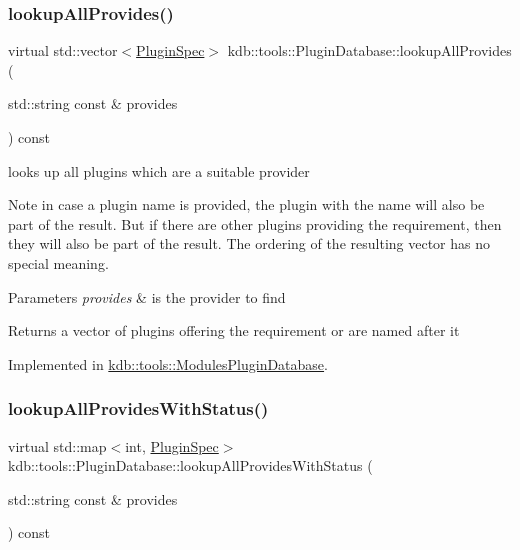 \subsubsection{\texorpdfstring{lookup\+All\+Provides()}{lookupAllProvides()}}
{\footnotesize\ttfamily virtual std\+::vector$<$\hyperlink{classkdb_1_1tools_1_1PluginSpec}{Plugin\+Spec}$>$ kdb\+::tools\+::\+Plugin\+Database\+::lookup\+All\+Provides (\begin{DoxyParamCaption}\item[{std\+::string const \&}]{provides }\end{DoxyParamCaption}) const\hspace{0.3cm}{\ttfamily [pure virtual]}}



looks up all plugins which are a suitable provider 

\begin{DoxyNote}{Note}
in case a plugin name is provided, the plugin with the name will also be part of the result. But if there are other plugins providing the requirement, then they will also be part of the result. The ordering of the resulting vector has no special meaning.
\end{DoxyNote}

\begin{DoxyParams}{Parameters}
{\em provides} & is the provider to find\\
\hline
\end{DoxyParams}
\begin{DoxyReturn}{Returns}
a vector of plugins offering the requirement or are named after it 
\end{DoxyReturn}


Implemented in \hyperlink{classkdb_1_1tools_1_1ModulesPluginDatabase_a306384e88f9cf2874f6ba9ce28973a26}{kdb\+::tools\+::\+Modules\+Plugin\+Database}.

\mbox{\label{classkdb_1_1tools_1_1PluginDatabase_aa918b547973f627a5604fa3b2b3faf30}} 
\subsubsection{\texorpdfstring{lookup\+All\+Provides\+With\+Status()}{lookupAllProvidesWithStatus()}}
{\footnotesize\ttfamily virtual std\+::map$<$int, \hyperlink{classkdb_1_1tools_1_1PluginSpec}{Plugin\+Spec}$>$ kdb\+::tools\+::\+Plugin\+Database\+::lookup\+All\+Provides\+With\+Status (\begin{DoxyParamCaption}\item[{std\+::string const \&}]{provides }\end{DoxyParamCaption}) const\hspace{0.3cm}{\ttfamily [pure virtual]}}



